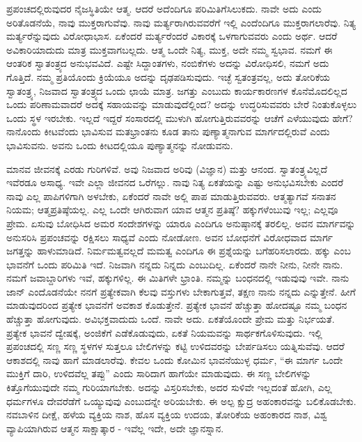 ಪ್ರಪಂಚದಲ್ಲಿರುವುದರ ನೈಜಸ್ಥಿತಿಯೇ ಆತ್ಮ. ಆದರೆ ಅದೆಂದಿಗೂ ಪರಿಮಿತಿಗೆ\break ಸಿಲುಕದು. ನಾವೇ ಅದು ಎಂದು ಅರಿತೊಡನೆಯೆ, ನಾವು ಮುಕ್ತರಾಗುವೆವು. ನಾವು ಮರ್ತ್ಯರಾಗಿರುವವರೆಗೆ ಇಲ್ಲಿ ಎಂದೆಂದಿಗೂ ಮುಕ್ತರಾಗಲಾರೆವು. ನಿತ್ಯ ಮರ್ತ್ಯರೆನ್ನುವುದು ವಿರೋಧಾಭಾಸ. ಏಕೆಂದರೆ ಮರ್ತ್ಯರೆಂದರೆ ವಿಕಾರಕ್ಕೆ ಒಳಗಾಗುವವರು ಎಂದು ಅರ್ಥ. ಆದರೆ ಅವಿಕಾರಿಯಾದುದು ಮಾತ್ರ ಮುಕ್ತವಾಗಬಲ್ಲದು. ಆತ್ಮ ಒಂದೇ ನಿತ್ಯ, ಮುಕ್ತ, ಅದೇ ನಮ್ಮ ಸ್ವಭಾವ. ನಮಗೆ ಈ ಆಂತರಿಕ ಸ್ವಾತಂತ್ರ್ಯದ ಅನುಭವವಿದೆ. ಎಷ್ಟೇ ಸಿದ್ದಾಂತಗಳು, ನಂಬಿಕೆಗಳು ಅದನ್ನು ವಿರೋಧಿಸಲಿ, ನಮಗೆ ಅದು ಗೊತ್ತಿದೆ. ನಮ್ಮ ಪ್ರತಿಯೊಂದು ಕ್ರಿಯೆಯೂ ಅದನ್ನು ದೃಢಪಡಿಸುವುದು. ಇಚ್ಛೆ ಸ್ವತಂತ್ರವಲ್ಲ, ಅದು ತೋರಿಕೆಯ ಸ್ವಾತಂತ್ರ್ಯ, ನಿಜವಾದ ಸ್ವಾತಂತ್ರ್ಯದ ಒಂದು ಛಾಯೆ ಮಾತ್ರ. ಜಗತ್ತು ಎಂಬುದು ಕಾರ್ಯಕಾರಣಗಳ ಕೊನೆಮೊದಲಿಲ್ಲದ ಒಂದು ಪರಿಣಾಮವಾದರೆ ಅದಕ್ಕೆ ಸಹಾಯವನ್ನು ಮಾಡುವುದೆಲ್ಲಿಂದ? ಅದನ್ನು ಉದ್ಧರಿಸುವವರು ಬೇರೆ ನಿಂತುಕೊಳ್ಳಲು ಒಂದು ಸ್ಥಳ ಇರಬೇಕು. ಇಲ್ಲದೆ ಇದ್ದರೆ ಸಂಸಾರದಲ್ಲಿ ಮುಳುಗಿ ಹೋಗುತ್ತಿರುವವರನ್ನು ಆಚೆಗೆ ಎಳೆಯುವುದು ಹೇಗೆ? ನಾನೊಂದು ಕೀಟವೆಂದು ಭಾವಿಸುವ ಮತಭ್ರಾಂತನು ಕೂಡ ತಾನು ಪುಣ್ಯಾತ್ಮನಾಗುವ ಮಾರ್ಗದಲ್ಲಿರುವೆ ಎಂದು ಭಾವಿಸುವನು. ಅವನು ಒಂದು ಕೀಟದಲ್ಲಿಯೂ ಪುಣ್ಯಾತ್ಮನನ್ನು ನೋಡುವನು.

ಮಾನವ ಜೀವನಕ್ಕೆ ಎರಡು ಗುರಿಗಳಿವೆ. ಅವು ನಿಜವಾದ ಅರಿವು (ವಿಜ್ಞಾನ) ಮತ್ತು ಆನಂದ. ಸ್ವಾತಂತ್ರ್ಯವಿಲ್ಲದೆ ಇವೆರಡೂ ಅಸಾಧ್ಯ. ಇವೇ ಎಲ್ಲಾ ಜೀವನದ ಒರೆಗಲ್ಲು. ನಾವು ನಿತ್ಯ ಏಕತೆಯನ್ನು ಎಷ್ಟು ಅನುಭವಿಸಬೇಕು ಎಂದರೆ ನಾವು ಎಲ್ಲ ಪಾಪಿಗಳಿಗಾಗಿ ಅಳಬೇಕು, ಏಕೆಂದರೆ ನಾವೇ ಅಲ್ಲಿ ಪಾಪ ಮಾಡುತ್ತಿರುವವರು. ಆತ್ಮತ್ಯಾಗವೆ ಸನಾತನ ನಿಯಮ; ಆತ್ಮಪ್ರತಿಷ್ಠೆಯಲ್ಲ. ಎಲ್ಲ ಒಂದೇ ಆಗಿರುವಾಗ ಯಾವ ಆತ್ಮನ ಪ್ರತಿಷ್ಠೆ? ಹಕ್ಕುಗಳೆಂಬುವು ಇಲ್ಲ; ಎಲ್ಲವೂ ಪ್ರೇಮ. ಏಸುವು ಬೋಧಿಸಿದ ಅಮರ ಸಂದೇಶಗಳನ್ನು ಯಾರೂ ಎಂದಿಗೂ ಅನುಷ್ಠಾನಕ್ಕೆ ತರಲಿಲ್ಲ. ಅವನ ಮಾರ್ಗವನ್ನು ಅನುಸರಿಸಿ ಪ್ರಪಂಚವನ್ನು ರಕ್ಷಿಸಲು ಸಾಧ್ಯವೆ ಎಂದು ನೋಡೋಣ. ಅವನ ಬೋಧನೆಗೆ ವಿರೋಧವಾದ ಮಾರ್ಗ ಜಗತ್ತನ್ನು ಹಾಳುಮಾಡಿದೆ. ನಿರ್ಮಮತ್ವವಲ್ಲದೆ ಮಮತ್ವ ಎಂದಿಗೂ ಈ ಪ್ರಶ್ನೆಯನ್ನು ಬಗೆಹರಿಸಲಾರದು. ಹಕ್ಕು ಎಂಬ ಭಾವನೆಗೆ ಒಂದು ಪರಿಮಿತಿ ಇದೆ. ನಿಜವಾಗಿ ನನ್ನದು ನಿನ್ನದು ಎಂಬುದಿಲ್ಲ. ಏಕೆಂದರೆ ನಾನೇ ನೀನು, ನೀನೇ ನಾನು. ನಮಗೆ ಜವಾಬ್ದಾರಿಗಳು ಇವೆ, ಹಕ್ಕುಗಳಿಲ್ಲ. ಈ ಮಿತಿಗಳೇ ಭ್ರಾಂತಿ. ನಮ್ಮನ್ನು ಬಂಧನದಲ್ಲಿ ಇಡುವುವು ಇವೇ. ನಾನು ಜಾನ್ ಎಂದೊಡನೆಯೇ ನನಗೆ ಪ್ರತ್ಯೇಕವಾಗಿ ಕೆಲವು ವಸ್ತುಗಳು ಬೇಕಾಗುತ್ತವೆ, ತಕ್ಷಣ ನಾನು ನನ್ನದು ಎನ್ನುತ್ತೇನೆ. ಹೀಗೆ ಮಾಡುವುದರಿಂದ ಪ್ರತ್ಯೇಕ ಭಾವನೆಗೆ ಅವಕಾಶ ಕೊಡುತ್ತೇನೆ. ಪ್ರತ್ಯೇಕ ಭಾವನೆ ಹೆಚ್ಚುತ್ತಾ ಹೋದಷ್ಟೂ ನಮ್ಮ ಬಂಧನ ಹೆಚ್ಚುತ್ತಾ ಹೋಗುವುದು. ಅವಿಭಕ್ತವಾದುದು ಒಂದೆ. ನಾವೇ ಅದು. ಏಕತೆಯೊಂದೇ ಪ್ರೇಮ ಮತ್ತು ನಿರ್ಭಯತೆ. ಪ್ರತ್ಯೇಕ ಭಾವನೆ ದ್ವೇಷಕ್ಕೆ, ಅಂಜಿಕೆಗೆ ಎಡೆಕೊಡುವುದು, ಏಕತೆ ನಿಯಮವನ್ನು ಸಾರ್ಥಕಗೊಳಿಸುವುದು. ಇಲ್ಲಿ ಪ್ರಪಂಚದಲ್ಲಿ ಸಣ್ಣ ಸಣ್ಣ ಸ್ಥಳಗಳ ಸುತ್ತಲೂ ಬೇಲಿಗಳನ್ನು ಕಟ್ಟಿ ಉಳಿದವರನ್ನು ಬೇರ್ಪಡಿಸಲು ಯತ್ನಿಸುವೆವು. ಆದರೆ ಆಕಾಶದಲ್ಲಿ ನಾವು ಹಾಗೆ ಮಾಡಲಾರೆವು. ಕೇವಲ ಒಂದು ಕೋಮಿನ ಭಾವನೆಯುಳ್ಳ ಧರ್ಮ, “ಈ ಮಾರ್ಗ ಒಂದೇ ಮುಕ್ತಿಗೆ ದಾರಿ, ಉಳಿದವೆಲ್ಲ ತಪ್ಪು'' ಎಂದು ಸಾರಿದಾಗ ಹಾಗೆಯೇ ಮಾಡುವುದು. ಈ ಸಣ್ಣ ಬೇಲಿಗಳನ್ನು ಕಿತ್ತೊಗೆಯುವುದೇ ನಮ್ಮ ಗುರಿಯಾಗಬೇಕು. ಅದನ್ನು ವಿಸ್ತರಿಸಬೇಕು, ಅದರ ಸುಳಿವೇ ಇಲ್ಲದಂತೆ ಹೋಗಿ, ಎಲ್ಲ ಧರ್ಮಗಳೂ ದೇವರೆಡೆಗೆ ಒಯ್ಯುವುವು ಎಂಬುದನ್ನೇ ಅರಿಯಬೇಕು. ಈ ಅಲ್ಪ ಕ್ಷುದ್ರ ಅಹಂಕಾರವನ್ನು ಬಲಿಕೊಡಬೇಕು. ನವಬಾಳಿನ ದೀಕ್ಷೆ, ಹಳೆಯ ವ್ಯಕ್ತಿಯ ನಾಶ, ಹೊಸ ವ್ಯಕ್ತಿಯ ಉದಯ, ತೋರಿಕೆಯ ಅಹಂಕಾರದ ನಾಶ, ವಿಶ್ವ ವ್ಯಾಪಿಯಾಗಿರುವ ಆತ್ಮನ ಸಾಕ್ಷಾತ್ಕಾರ - ಇವೆಲ್ಲ ಇದೇ, ಅದೇ ಜ್ಞಾನಸ್ನಾನ.

